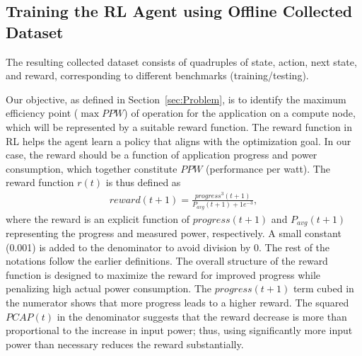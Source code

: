 \subsection{Training the RL Agent using Offline Collected Dataset}\label{sec:training}
The resulting collected dataset consists of quadruples of state, action, next state, and reward, corresponding to different benchmarks (training/testing). 



Our objective, as defined in Section~\ref{sec:Problem}, is to identify the maximum efficiency point ($\max{PPW}$) of operation for the application on a compute node, which will be represented by a suitable reward function. The reward function in RL helps the agent learn a policy that aligns with the optimization goal. In our case, the reward should be a function of application progress and power consumption, which together constitute $PPW$ (performance per watt). The reward function $r(t)$ is thus defined as
\begin{equation}
\begin{aligned}
reward(t+1) = \frac{progress^3(t+1)}{P_{avg}(t+1)+1e^{-3}},
\end{aligned}
\label{eq:reward_function}
\end{equation}
%
where the reward is an explicit function of $progress(t+1)$ and $P_{avg}(t+1)$ representing the progress and measured power, respectively. A small constant (0.001) is added to the denominator to avoid division by 0. The rest of the notations follow the earlier definitions. The overall structure of the reward function is designed to maximize the reward for improved progress while penalizing high actual power consumption. The $progress(t+1)$ term cubed in the numerator shows that more progress leads to a higher reward. 
The squared $PCAP(t)$ in the denominator suggests that the reward decrease is more than proportional to the increase in input power; thus, using significantly more input power than necessary reduces the reward substantially. 

